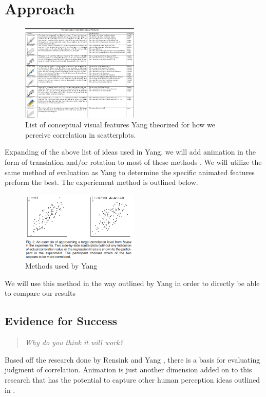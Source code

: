 \documentclass{proc}
\begin{document}
	\section{Approach}
		\begin{figure}[t]
			\centering
				\includegraphics[width=0.5\textwidth]{concepts}
				\caption{List of conceptual visual features Yang theorized for how we perceive correlation in scatterplots.}
			\label{fig:concepts}
		\end{figure}
		Expanding of the above list of ideas used in Yang, we will add animation in the form of translation and/or rotation to most of these methods \cite{Yang2019}. We will utilize the same method of evaluation as Yang to determine the specific animated features preform the best. The experiement method is outlined below.
		\begin{figure} [t]
			\centering
				\includegraphics[width=0.5\textwidth]{methods}
				\caption{Methods used by Yang}
			\label{fig:methods}
		\end{figure}
		We will use this method in the way outlined by Yang in order to directly be able to compare our results

	\subsection{Evidence for Success}
	\begin{quote}
		\textit{Why do you think it will work?} 
	\end{quote}
		Based off the research done by Rensink \cite{Rensink2017} and Yang \cite{Yang2019}, there is a basis for evaluating judgment of correlation. Animation is just another dimension added on to this research that has the potential to capture other human perception ideas outlined in \cite{larsen1998effects}. 
	
\end{document}
